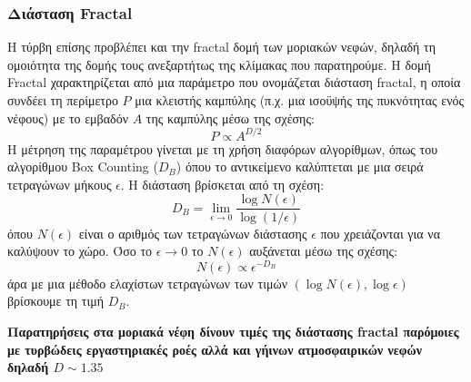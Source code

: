 \documentclass[a4paper,12pt]{memoir}
\begin{document}
\subsubsection{Διάσταση Fractal}
Η τύρβη επίσης προβλέπει και την fractal δομή των μοριακών νεφών, δηλαδή τη ομοιότητα της δομής τους ανεξαρτήτως της κλίμακας που παρατηρούμε. 
Η δομή Fractal χαρακτηρίζεται από μια παράμετρο που ονομάζεται διάσταση fractal, η οποία συνδέει τη περίμετρο $P$ μια κλειστής καμπύλης (π.χ. μια ισοϋψής της πυκνότητας ενός νέφους) με το εμβαδόν $A$ της καμπύλης μέσω της σχέσης:
\begin{equation}
P\propto A^{D/2}
\end{equation}
Η μέτρηση της παραμέτρου γίνεται με τη χρήση διαφόρων αλγορίθμων, όπως του αλγορίθμου Box Counting ($D_B$) όπου το αντικείμενο καλύπτεται με μια σειρά τετραγώνων μήκους $\epsilon$. Η διάσταση βρίσκεται από τη σχέση:
\begin{equation}
D_B = \lim_{\epsilon \to 0} \frac{\log N(\epsilon)}{\log (1/\epsilon)}
\end{equation}
όπου $N(\epsilon)$ είναι ο αριθμός των τετραγώνων διάστασης $\epsilon$ που χρειάζονται για να καλύψουν το χώρο. Όσο το $\epsilon \to  0$ το $N(\epsilon)$ αυξάνεται μέσω της σχέσης:
\begin{equation}
N(\epsilon) \propto \epsilon ^{-D_B}
\end{equation}
άρα με μια μέθοδο ελαχίστων τετραγώνων των τιμών $\left(\log N(\epsilon),\log \epsilon\right)$ βρίσκουμε τη τιμή $D_B$.

\textbf{Παρατηρήσεις στα μοριακά νέφη δίνουν τιμές της διάστασης fractal παρόμοιες με τυρβώδεις εργαστηριακές ροές αλλά και γήινων ατμοσφαιρικών νεφών δηλαδή $D\sim 1.35$}
 
 
 
 
\end{document}
